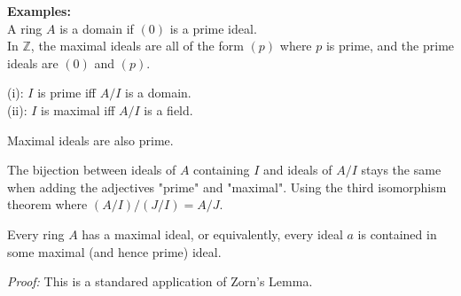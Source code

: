 \documentclass{article}
\newcommand{\Z}{\mathbb{Z}}
\begin{document}
\textbf{Examples:\\}
A ring $A$ is a domain if $(0)$ is a prime ideal.\\
In $\Z$, the maximal ideals are all of the form $(p)$ where $p$ is prime, and the prime ideals are $(0)$ and $(p)$.

\begin{clai}{}{}
\indent (i): $I$ is prime iff $A/I$ is a domain.\\
\indent (ii): $I$ is maximal iff $A/I$ is a field.
\end{clai}

\begin{coroll}{}{}
	Maximal ideals are also prime.
\end{coroll}

The bijection between ideals of $A$ containing $I$ and ideals of $A/I$ stays the same when adding the adjectives "prime" and "maximal". Using the third isomorphism theorem where $(A/I)/(J/I)  = A/J$.\\

\begin{lemm}{}{}
Every ring $A$ has a maximal ideal, or equivalently, every ideal $a$ is contained in some maximal (and hence prime) ideal.
\end{lemm}

\textit{Proof:}  This is a standared application of Zorn's Lemma.















 
\end{document}
